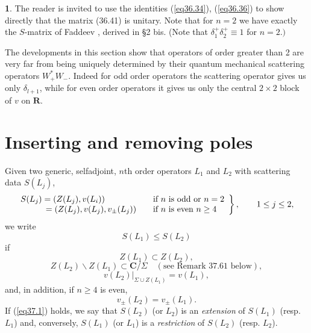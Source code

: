 \documentclass{surv-l}
\theoremstyle{plain}
\theoremstyle{definition}
\newtheorem*{rems}{\sc{Remarks}}
\numberwithin{equation}{chapter}
\begin{document}
\begin{rems} The reader is invited to use the identities (\ref{eq36.34}), (\ref{eq36.36}) to show directly that the matrix (36.41) is unitary. Note that for $n=2$ we have exactly the $S$-matrix of Faddeev \cite{Fa2}, derived in \S 2 bis. (Note that $\delta_{1}^{+}\delta_{2}^{+}\equiv 1$ for $n=2.)$

The developments in this section show that operators of order greater than 2 are very far from being uniquely determined by their quantum mechanical scattering operators $W_{+}^{*}W_{-}$. Indeed for odd order operators the scattering operator gives us only $\delta_{l+1}$, while for even order operators it gives us only the central $2\times 2$ block of $v$ on $\mathbf{R}$.
\end{rems}



\section{Inserting and removing poles}\label{sec37}
Given two generic, selfadjoint, $n$th order operators $L_{1}$ and $L_{2}$ with scattering data $S(L_{j})$,
\begin{align*}
\left.
\begin{array}{@{}ll@{}}
\begin{array}{@{}l@{}}
S(L_{j})=(Z(L_{j}),v(L_{i}))\\
\qquad\quad=(Z(L_{j}),v(L_{j}),v_{\pm}(L_{j}))
\end{array}
\begin{array}{@{}l@{}}
\qquad\text{if $n$ is odd or }n=2\\
\qquad\text{if $n$ is even }n \geq 4
\end{array}
\end{array}
\right\},\qquad 1\leq j\leq 2,
\end{align*}
we write
\begin{equation}\label{eq37.1}
S(L_{1})\leq S(L_{2})
\end{equation}
if
\begin{equation}\label{eq37.2}
Z(L_{1})\subset Z(L_{2}),
\end{equation}
\begin{equation}\label{eq37.3}
Z(L_{2})\backslash Z(L_{1})\subset \mathbf{C}/\Sigma\quad (\text{see Remark 37.61 below}),
\end{equation}
\begin{equation}\label{eq37.4}
v(L_{2})|_{\Sigma\cup Z(L_{1})}=v(L_{1}),
\end{equation}
and, in addition, if $n\geq 4$ is even,
\begin{equation}\label{eq37.5}
v_{\pm}(L_{2})=v_{\pm}(L_{1}).
\end{equation}
If (\ref{eq37.1}) holds, we say that $S(L_{2})$ (or $L_{2}$) is an \emph{extension} of $S(L_{1})$ (resp. $L_{1}$) and, conversely, $S(L_{1})$ (or $L_{1}$) is a \emph{restriction} of $S(L_{2})$ (resp. $L_{2}$).
\end{document}
